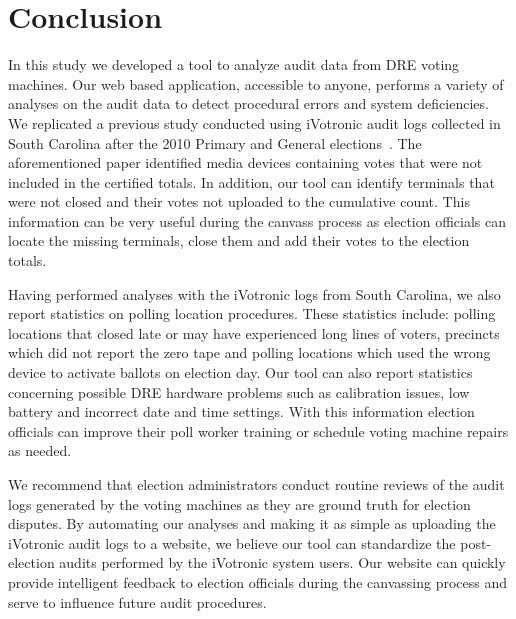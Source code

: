 \section{Conclusion}
In this study we developed a tool to analyze audit data from DRE voting machines. Our web based application, accessible to anyone, performs a variety of analyses on the audit data to detect procedural errors and system deficiencies. We replicated a previous study conducted using iVotronic audit logs collected in South Carolina after the 2010 Primary and General elections~\cite{Buell2011}. The aforementioned paper identified media devices containing votes that were not included in the certified totals. In addition, our tool can identify terminals that were not closed and their votes not uploaded to the cumulative count. This information can be very useful during the canvass process as election officials can locate the missing terminals, close them and add their votes to the election totals. 

Having performed analyses with the iVotronic logs from South Carolina, we also report statistics on polling location procedures. These statistics include: polling locations that closed late or may have experienced long lines of voters, precincts which did not report the zero tape and polling locations which used the wrong device to activate ballots on election day. Our tool can also report statistics concerning possible DRE hardware problems such as calibration issues, low battery and incorrect date and time settings. With this information election officials can improve their poll worker training or schedule voting machine repairs as needed.

We recommend that election administrators conduct routine reviews of the audit logs generated by the voting machines as they are ground truth for election disputes. By automating our analyses and making it as simple as uploading the iVotronic audit logs to a website, we believe our tool can standardize the post-election audits performed by the iVotronic system users. Our website can quickly provide intelligent feedback to election officials during the canvassing process and serve to influence future audit procedures. 
